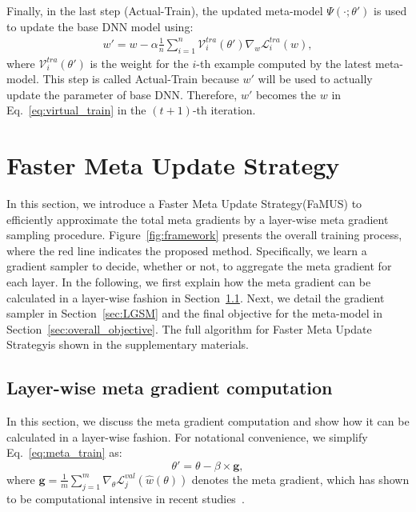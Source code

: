 \documentclass[final]{cvpr}
\newcommand{\methodname}{Faster Meta Update Strategy}
\newcommand{\methodnameabbre}{FaMUS}
\begin{document}
Finally, in the last step (Actual-Train), the updated meta-model $\Psi(\cdot;\theta')$ is used to update the base DNN model using:
\begin{equation}\label{eq:actual_train}
\begin{split}
    w' = w - \alpha \frac{1}{n} \sum_{i=1}^{n}\mathcal{V}_i^{tra}(\theta')\nabla_{w}\mathcal{L}_i^{tra}(w),
\end{split}
\end{equation}
where $\mathcal{V}_i^{tra}(\theta')$ is the weight for the $i$-th example computed by the latest meta-model. This step is called Actual-Train because $w'$ will be used to actually update the parameter of base DNN. Therefore, $w'$ becomes the $w$ in Eq.~\eqref{eq:virtual_train} in the $(t+1)$-th iteration. 


\section{\methodname}
In this section, we introduce a \methodname\space(\methodnameabbre) to efficiently approximate the total meta gradients by a layer-wise meta gradient sampling procedure. 
Figure~\ref{fig:framework} presents the overall training process, where the red line indicates the proposed method. Specifically, we learn a gradient sampler to decide, whether or not, to aggregate the meta gradient for each layer.
In the following, 
we first explain how the meta gradient can be calculated in a layer-wise fashion in Section~\ref{sec:slow_training}.
Next, we detail the gradient sampler in Section~\ref{sec:LGSM} and the final objective for the meta-model in Section~\ref{sec:overall_objective}. 
The full algorithm for \methodname\space is shown in the supplementary materials. 



\subsection{Layer-wise meta gradient computation}\label{sec:slow_training}
In this section, we discuss the meta gradient computation and show how it can be calculated in a layer-wise fashion.
For notational convenience, we simplify Eq.~\eqref{eq:meta_train} as:
\begin{equation}\label{eq:simple_meta_train}
\theta' = \theta - \beta \times \mathbf{g},
\end{equation}
where $\mathbf{g} = \frac{1}{m}\sum_{j=1}^{m}\nabla_{\theta}\mathcal{L}_j^{val}(\hat{w}(\theta))$ denotes the meta gradient, which has shown to be computational intensive in recent studies~\cite{ren2018learning, shu2019meta, wang2020training}. 
\end{document}
